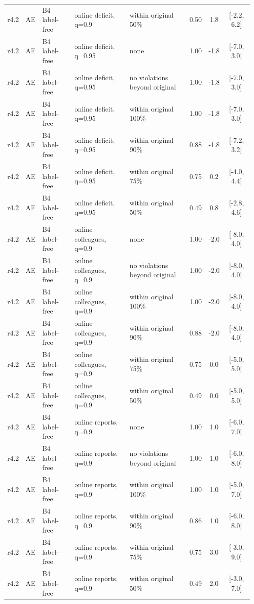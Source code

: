 \documentclass[10pt,onecolumn,letterpaper]{article}
\begin{document}
\begin{longtable}{lllp{4.2cm}p{3.4cm}ccc}
r4.2 & AE & B4 label-free & online deficit, q=0.9 & within original 50\% & 0.50 & 1.8 & [-2.2, 6.2] \\
r4.2 & AE & B4 label-free & online deficit, q=0.95 & none & 1.00 & -1.8 & [-7.0, 3.0] \\
r4.2 & AE & B4 label-free & online deficit, q=0.95 & no violations beyond original & 1.00 & -1.8 & [-7.0, 3.0] \\
r4.2 & AE & B4 label-free & online deficit, q=0.95 & within original 100\% & 1.00 & -1.8 & [-7.0, 3.0] \\
r4.2 & AE & B4 label-free & online deficit, q=0.95 & within original 90\% & 0.88 & -1.8 & [-7.2, 3.2] \\
r4.2 & AE & B4 label-free & online deficit, q=0.95 & within original 75\% & 0.75 & 0.2 & [-4.0, 4.4] \\
r4.2 & AE & B4 label-free & online deficit, q=0.95 & within original 50\% & 0.49 & 0.8 & [-2.8, 4.6] \\
r4.2 & AE & B4 label-free & online colleagues, q=0.9 & none & 1.00 & -2.0 & [-8.0, 4.0] \\
r4.2 & AE & B4 label-free & online colleagues, q=0.9 & no violations beyond original & 1.00 & -2.0 & [-8.0, 4.0] \\
r4.2 & AE & B4 label-free & online colleagues, q=0.9 & within original 100\% & 1.00 & -2.0 & [-8.0, 4.0] \\
r4.2 & AE & B4 label-free & online colleagues, q=0.9 & within original 90\% & 0.88 & -2.0 & [-8.0, 4.0] \\
r4.2 & AE & B4 label-free & online colleagues, q=0.9 & within original 75\% & 0.75 & 0.0 & [-5.0, 5.0] \\
r4.2 & AE & B4 label-free & online colleagues, q=0.9 & within original 50\% & 0.49 & 0.0 & [-5.0, 5.0] \\
r4.2 & AE & B4 label-free & online reports, q=0.9 & none & 1.00 & 1.0 & [-6.0, 7.0] \\
r4.2 & AE & B4 label-free & online reports, q=0.9 & no violations beyond original & 1.00 & 1.0 & [-6.0, 8.0] \\
r4.2 & AE & B4 label-free & online reports, q=0.9 & within original 100\% & 1.00 & 1.0 & [-5.0, 7.0] \\
r4.2 & AE & B4 label-free & online reports, q=0.9 & within original 90\% & 0.86 & 1.0 & [-6.0, 8.0] \\
r4.2 & AE & B4 label-free & online reports, q=0.9 & within original 75\% & 0.75 & 3.0 & [-3.0, 9.0] \\
r4.2 & AE & B4 label-free & online reports, q=0.9 & within original 50\% & 0.49 & 2.0 & [-3.0, 7.0] \\

\end{longtable}
\end{document}
